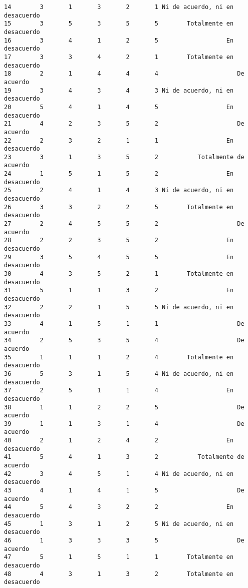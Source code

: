 \documentclass[
  letterpaper,
  DIV=11,
  numbers=noendperiod]{scrartcl}
\begin{document}
\begin{verbatim}
14        3       1       3       2       1 Ni de acuerdo, ni en desacuerdo
15        3       5       3       5       5        Totalmente en desacuerdo
16        3       4       1       2       5                   En desacuerdo
17        3       3       4       2       1        Totalmente en desacuerdo
18        2       1       4       4       4                      De acuerdo
19        3       4       3       4       3 Ni de acuerdo, ni en desacuerdo
20        5       4       1       4       5                   En desacuerdo
21        4       2       3       5       2                      De acuerdo
22        2       3       2       1       1                   En desacuerdo
23        3       1       3       5       2           Totalmente de acuerdo
24        1       5       1       5       2                   En desacuerdo
25        2       4       1       4       3 Ni de acuerdo, ni en desacuerdo
26        3       3       2       2       5        Totalmente en desacuerdo
27        2       4       5       5       2                      De acuerdo
28        2       2       3       5       2                   En desacuerdo
29        3       5       4       5       5                   En desacuerdo
30        4       3       5       2       1        Totalmente en desacuerdo
31        5       1       1       3       2                   En desacuerdo
32        2       2       1       5       5 Ni de acuerdo, ni en desacuerdo
33        4       1       5       1       1                      De acuerdo
34        2       5       3       5       4                      De acuerdo
35        1       1       1       2       4        Totalmente en desacuerdo
36        5       3       1       5       4 Ni de acuerdo, ni en desacuerdo
37        2       5       1       1       4                   En desacuerdo
38        1       1       2       2       5                      De acuerdo
39        1       1       3       1       4                      De acuerdo
40        2       1       2       4       2                   En desacuerdo
41        5       4       1       3       2           Totalmente de acuerdo
42        3       4       5       1       4 Ni de acuerdo, ni en desacuerdo
43        4       1       4       1       5                      De acuerdo
44        5       4       3       2       2                   En desacuerdo
45        1       3       1       2       5 Ni de acuerdo, ni en desacuerdo
46        1       3       3       3       5                      De acuerdo
47        5       1       5       1       1        Totalmente en desacuerdo
48        4       3       1       3       2        Totalmente en desacuerdo

\end{verbatim}
\end{document}
